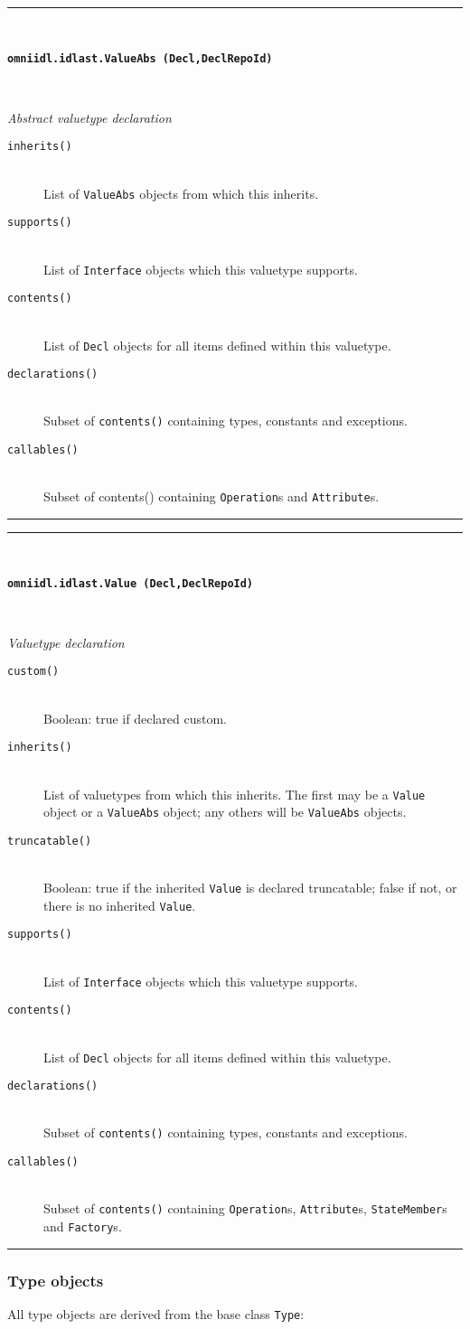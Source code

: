 \documentclass[11pt,twoside,a4paper]{article}
\newcommand{\func}[1]{\texttt{#1}}
\newcommand{\class}[1]{\texttt{#1}}
\newcommand{\dfunc}[1]{\item[\func{#1}]\mbox{}\\}
\newenvironment{classdesc}[2]%
  {\vspace{\baselineskip}%
   \noindent\begin{minipage}{\textwidth}%
   \noindent\rule{\textwidth}{1.5pt}\\%
   \centerline{\textbf{\texttt{#1}}}\\%
   \centerline{\textit{#2}}%
   \vspace{-.5\baselineskip}%
   \begin{description}}
  {\vspace{-\baselineskip}\end{description}%
   \noindent\rule{\textwidth}{1.5pt}\end{minipage}}
\begin{document}
\begin{classdesc}
  {omniidl.idlast.ValueAbs (Decl,DeclRepoId)}
  {Abstract valuetype declaration}

\dfunc{inherits()}
  List of \class{ValueAbs} objects from which this inherits.

\dfunc{supports()}
  List of \class{Interface} objects which this valuetype supports.

\dfunc{contents()}
  List of \class{Decl} objects for all items defined within this
  valuetype.

\dfunc{declarations()}
  Subset of \func{contents()} containing types, constants and
  exceptions.

\dfunc{callables()}
  Subset of contents() containing \class{Operation}s and
  \class{Attribute}s.

\end{classdesc}


\begin{classdesc}
  {omniidl.idlast.Value (Decl,DeclRepoId)}
  {Valuetype declaration}

\dfunc{custom()}
  Boolean: true if declared custom.

\dfunc{inherits()}
  List of valuetypes from which this inherits. The first may be a
  \class{Value} object or a \class{ValueAbs} object; any others will
  be \class{ValueAbs} objects.

\dfunc{truncatable()}
  Boolean: true if the inherited \class{Value} is declared
  truncatable; false if not, or there is no inherited \class{Value}.

\dfunc{supports()}
  List of \class{Interface} objects which this valuetype supports.

\dfunc{contents()}
  List of \class{Decl} objects for all items defined within this
  valuetype.

\dfunc{declarations()}
  Subset of \func{contents()} containing types, constants and
  exceptions.

\dfunc{callables()}
  Subset of \func{contents()} containing \class{Operation}s,
  \class{Attribute}s, \class{StateMember}s and \class{Factory}s.

\end{classdesc}



\subsubsection{Type objects}

All type objects are derived from the base class \class{Type}:
\end{document}
